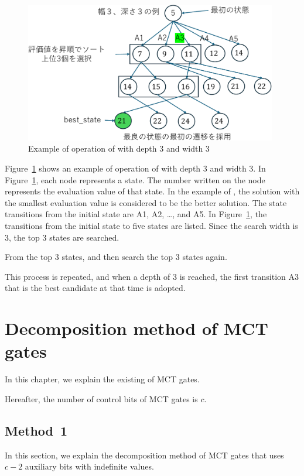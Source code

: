 \begin{figure}[tbp]
\centering
\includegraphics[width=11cm]{img/beam_search.pdf}
\caption{Example of operation of  with depth 3 and width 3}
\label{beam_search}
\end{figure}
Figure~\ref{beam_search} shows an example of operation of  with depth 3 and width 3.
In Figure~\ref{beam_search}, each node represents a state.
The number written on the node represents the evaluation value of that state.
In the example of , the solution with the smallest evaluation value is considered to be the better solution.
The state transitions from the initial state are A1, A2, \dots, and A5.
In Figure~\ref{beam_search}, the transitions from the initial state to five states are listed.
Since the search width is 3, the top 3 states are searched.

From the top 3 states,  and then search the top 3 states again.

This process is repeated, and when a depth of 3 is reached, the first transition A3 that is the best candidate at that time is adopted.

\section{Decomposition method of MCT gates}
In this chapter, we explain the existing  of MCT gates.

Hereafter, the number of control bits of MCT gates is $c$.

\subsection{Method~1}
In this section, we explain the decomposition method \cite{abdessaied2016technology} of MCT gates that uses $c-2$ auxiliary bits with indefinite values.

